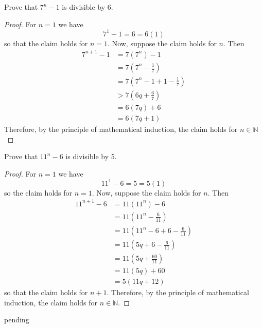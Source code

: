 \begin{exercise} \label{0.96}
	Prove that \( 7^n - 1 \) is divisible by 6. 
	
	\begin{proof}
	    For \( n = 1 \) we have
	    \[ 7^1 -1 = 6 = 6(1) \]
	    so that the claim holds for \( n = 1 \). Now, suppose the claim holds for \( n \). Then
	    \begin{align*}
	        7^{n+1} - 1 &= 7(7^n) - 1 \\
	        &= 7 \left(7^n - \frac{1}{7}\right) \\
	        &= 7 \left(7^n -1 + 1 - \frac{1}{7}\right) \\
	        &> 7 \left(6q + \frac{6}{7}\right) \\
	        &= 6(7q) + 6 \\
	        &= 6(7q + 1)
	    \end{align*}
	    Therefore, by the principle of mathematical induction, the claim holds for \( n \in \mathbb{N} \)
	\end{proof}
\end{exercise}

\begin{exercise} \label{0.97}
	Prove that \( 11^n - 6 \) is divisible by 5.
	
	\begin{proof}
	    For \( n = 1 \) we have
	    \[ 11^1 - 6 = 5 = 5(1) \]
	    so the claim holds for \( n = 1 \). Now, suppose the claim holds for \( n \). Then
	    \begin{align*}
	        11^{n+1} - 6 &= 11(11^n) - 6 \\
	        &= 11 \left( 11^n - \frac{6}{11} \right) \\
	        &= 11 \left( 11^n - 6 + 6 - \frac{6}{11} \right) \\
	        &= 11 \left( 5q + 6 - \frac{6}{11} \right) \\
	        &= 11 \left( 5q + \frac{60}{11} \right) \\
	        &= 11(5q) + 60 \\
	        &= 5 (11q + 12)
	    \end{align*}
	    so that the claim holds for \( n+1 \). Therefore, by the principle of mathematical induction, the claim holds for \( n \in \mathbb{N} \).
	\end{proof}
\end{exercise}

\begin{exercise} \label{0.98}
	pending
\end{exercise}

